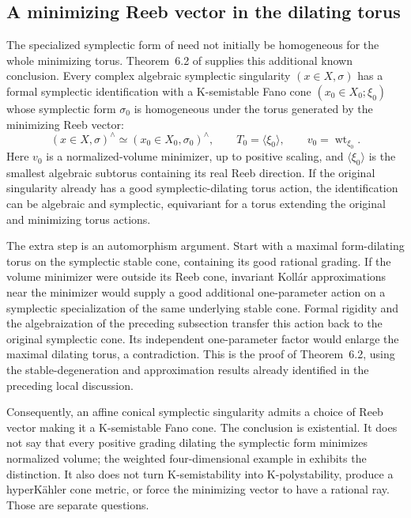\subsection{A minimizing Reeb vector in the dilating torus}
\label{sec:ytd-local-symplectic-minimizing-torus}

The specialized symplectic form of
 need not initially
be homogeneous for the whole minimizing torus. Theorem~6.2
of \cite{XuZhuang26StableFormsV2} supplies this additional
known conclusion. Every complex algebraic symplectic singularity
$(x\in X,\sigma)$ has a formal symplectic identification with
a K-semistable Fano cone $(x_0\in X_0;\xi_0)$ whose symplectic
form $\sigma_0$ is homogeneous under the torus generated by
the minimizing Reeb vector:
\[
\tag{68.23bt}\label{eq:ytd-symplectic-minimizing-torus}
 (x\in X,\sigma)^\wedge\simeq
       (x_0\in X_0,\sigma_0)^\wedge,
 \qquad
 T_0=\langle\xi_0\rangle,
 \qquad
 v_0=\operatorname{wt}_{\xi_0}.
\]
Here $v_0$ is a normalized-volume minimizer, up to positive
scaling, and $\langle\xi_0\rangle$ is the smallest algebraic
subtorus containing its real Reeb direction. If the original
singularity already has a good symplectic-dilating torus action,
the identification can be algebraic and symplectic, equivariant
for a torus extending the original and minimizing torus actions.

The extra step is an automorphism argument. Start with a
maximal form-dilating torus on the symplectic stable cone,
containing its good rational grading. If the volume minimizer
were outside its Reeb cone, invariant Koll\'ar approximations
near the minimizer would supply a good additional
one-parameter action on a symplectic specialization of the
same underlying stable cone. Formal rigidity and the
algebraization of the preceding subsection transfer this
action back to the original symplectic cone. Its independent
one-parameter factor would enlarge the maximal dilating
torus, a contradiction. This is the proof of Theorem~6.2,
using the stable-degeneration and approximation results
already identified in the preceding local discussion.

Consequently, an affine conical symplectic singularity admits
a choice of Reeb vector making it a K-semistable Fano cone.
The conclusion is existential. It does not say that every
positive grading dilating the symplectic form minimizes
normalized volume; the weighted four-dimensional example
in  exhibits the distinction.
It also does not turn K-semistability into K-polystability,
produce a hyperK\"ahler cone metric, or force the minimizing
vector to have a rational ray. Those are separate questions.

